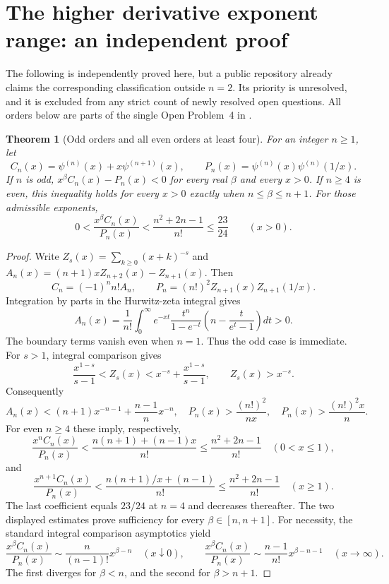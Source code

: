 \documentclass[11pt,a4paper]{article}
\newtheorem{theorem}{Theorem}[section]
\theoremstyle{definition}
\theoremstyle{remark}
\numberwithin{equation}{section}
\begin{document}
\section{The higher derivative exponent range: an independent proof}
\label{p2:sec:qln-op4-independent}
The following is independently proved here, but a public repository
\cite{p2:pudim2026} already claims the corresponding classification outside
$n=2$.  Its priority is unresolved, and it is excluded from any strict count
of newly resolved open questions.  All orders below are parts of the single
Open Problem~4 in \cite{p2:qln2025}.

\begin{theorem}[Odd orders and all even orders at least four]
For an integer $n\ge1$, let
\[
 C_n(x)=\psi^{(n)}(x)+x\psi^{(n+1)}(x),\qquad
 P_n(x)=\psi^{(n)}(x)\psi^{(n)}(1/x).
\]
If $n$ is odd, $x^\beta C_n(x)-P_n(x)<0$ for every real $\beta$ and every
$x>0$.  If $n\ge4$ is even, this inequality holds for every $x>0$ exactly
when $n\le\beta\le n+1$.  For those admissible exponents,
\[
 0<\frac{x^\beta C_n(x)}{P_n(x)}
 <\frac{n^2+2n-1}{n!}\le\frac{23}{24}\qquad(x>0).
\]
\end{theorem}
\begin{proof}
Write $Z_s(x)=\sum_{k\ge0}(x+k)^{-s}$ and
$A_n(x)=(n+1)xZ_{n+2}(x)-Z_{n+1}(x)$.  Then
\[
 C_n=(-1)^n n!A_n,\qquad
 P_n=(n!)^2Z_{n+1}(x)Z_{n+1}(1/x).
\]
Integration by parts in the Hurwitz-zeta integral gives
\[
 A_n(x)=\frac1{n!}\int_0^\infty e^{-xt}
       \frac{t^n}{1-e^{-t}}
       \left(n-\frac{t}{e^t-1}\right)dt>0.
\]
The boundary terms vanish even when $n=1$.  Thus the odd case is immediate.
For $s>1$, integral comparison gives
\[
 \frac{x^{1-s}}{s-1}<Z_s(x)
 <x^{-s}+\frac{x^{1-s}}{s-1},\qquad Z_s(x)>x^{-s}.
\]
Consequently
\[
 A_n(x)<(n+1)x^{-n-1}+\frac{n-1}{n}x^{-n},
 \quad P_n(x)>\frac{(n!)^2}{nx},
 \quad P_n(x)>\frac{(n!)^2x}{n}.
\]
For even $n\ge4$ these imply, respectively,
\[
 \frac{x^nC_n(x)}{P_n(x)}
 <\frac{n(n+1)+(n-1)x}{n!}
 \le\frac{n^2+2n-1}{n!}\quad(0<x\le1),
\]
and
\[
 \frac{x^{n+1}C_n(x)}{P_n(x)}
 <\frac{n(n+1)/x+(n-1)}{n!}
 \le\frac{n^2+2n-1}{n!}\quad(x\ge1).
\]
The last coefficient equals $23/24$ at $n=4$ and decreases thereafter.
The two displayed estimates prove sufficiency for every $\beta\in[n,n+1]$.
For necessity, the standard integral comparison asymptotics yield
\[
 \frac{x^\beta C_n(x)}{P_n(x)}
 \sim\frac{n}{(n-1)!}x^{\beta-n}\quad(x\downarrow0),
 \qquad
 \frac{x^\beta C_n(x)}{P_n(x)}
 \sim\frac{n-1}{n!}x^{\beta-n-1}\quad(x\to\infty).
\]
The first diverges for $\beta<n$, and the second for $\beta>n+1$.
\end{proof}
\end{document}
